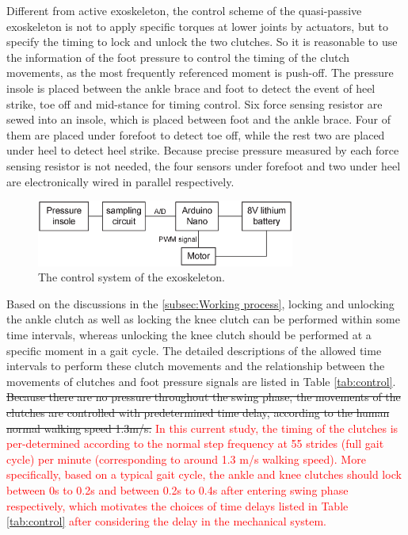 \documentclass[twocolumn,cleanfoot,10pt]{asme2ej}
\begin{document}
Different from active exoskeleton, the control scheme of the quasi-passive exoskeleton is not to apply specific torques at lower joints by actuators, but to specify the timing to lock and unlock the two clutches.
So it is reasonable to use the information of the foot pressure to control the timing of the clutch movements, as the most frequently referenced moment is push-off.
The pressure insole is placed between the ankle brace and foot to detect the event of heel strike, toe off and mid-stance for timing control.
Six force sensing resistor are sewed into an insole, which is placed between foot and the ankle brace.
Four of them are placed under forefoot to detect toe off, while the rest two are placed under heel to detect heel strike.
Because precise pressure measured by each force sensing resistor is not needed, the four sensors under forefoot and two under heel are electronically wired in parallel respectively. 

\begin{figure}[t]
	\centering
	\includegraphics[width=8.5cm]{control.eps}
	\caption{The control system of the exoskeleton.}
	\label{fig:control}   
\end{figure}

Based on the discussions in the \ref{subsec:Working process}, locking and unlocking the ankle clutch as well as locking the knee clutch can be performed within some time intervals, whereas unlocking the knee clutch should be performed at a specific moment in a gait cycle.
The detailed descriptions of the allowed time intervals to perform these clutch movements and the relationship between the movements of clutches and foot pressure signals are listed in Table \ref{tab:control}.
\sout{Because there are no pressure throughout the swing phase, the movements of the clutches are controlled with predetermined time delay, according to the human normal walking speed 1.3m/s.}
\textcolor{red}{In this current study, the timing of the clutches is per-determined according to the normal step frequency at 55 strides (full gait cycle) per minute (corresponding to around 1.3 m/s walking speed).
More specifically, based on a typical gait cycle, the ankle and knee clutches should lock between 0s to 0.2s and between 0.2s to 0.4s after entering swing phase respectively, which motivates the choices of time delays listed in Table \ref{tab:control} after considering the delay in the mechanical system.}
\end{document}
